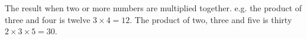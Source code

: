 The result when two or more numbers are multiplied together.
e.g. the product of three and four is twelve $3 \times 4 = 12$. 
The product of two, three and five is thirty $2 \times 3 \times 5 = 30$.